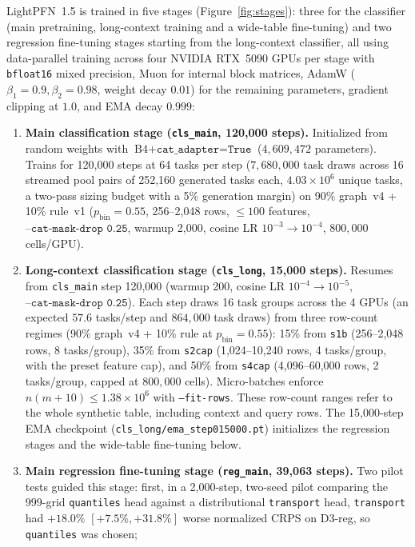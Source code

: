 \documentclass[11pt]{article}
\begin{document}
LightPFN~1.5 is trained in five stages (Figure~\ref{fig:stages}): three for the classifier (main pretraining, long-context training and a wide-table fine-tuning) and two regression fine-tuning stages starting from the long-context classifier, all using data-parallel training across four NVIDIA RTX~5090 GPUs per stage with \texttt{bfloat16} mixed precision, Muon \cite{jordan2024muon} for internal block matrices, AdamW ($\beta_1=0.9, \beta_2=0.98$, weight decay $0.01$) for the remaining parameters, gradient clipping at $1.0$, and EMA decay $0.999$: %
\begin{enumerate}
\item \textbf{Main classification stage (\texttt{cls\_main}, 120,000 steps).}
Initialized from random weights with $\text{B4} + \texttt{cat\_adapter=True}$ ($4{,}609{,}472$ parameters).
Trains for 120,000 steps at 64 tasks per step ($7{,}680{,}000$ task draws across 16 streamed pool pairs of 252,160 generated tasks each, $4.03\times 10^6$ unique tasks, a two-pass sizing budget with a 5\% generation margin) on 90\% graph~v4 + 10\% rule~v1 ($p_{\mathrm{bin}}=0.55$, 256--2,048 rows, $\le 100$ features, $\texttt{--cat-mask-drop 0.25}$, warmup 2,000, cosine LR $10^{-3}\to 10^{-4}$, $800{,}000$ cells/GPU). %
\item \textbf{Long-context classification stage (\texttt{cls\_long}, 15,000 steps).}
Resumes from \texttt{cls\_main} step 120,000 (warmup 200, cosine LR $10^{-4}\to 10^{-5}$, $\texttt{--cat-mask-drop 0.25}$).
Each step draws 16 task groups across the 4 GPUs (an expected $57.6$ tasks/step and $864{,}000$ task draws) from three row-count regimes (90\% graph~v4 + 10\% rule at $p_{\mathrm{bin}}=0.55$):
15\% from \texttt{s1b} (256--2,048 rows, 8 tasks/group),
35\% from \texttt{s2cap} (1,024--10,240 rows, 4 tasks/group, with the preset feature cap), and
50\% from \texttt{s4cap} (4,096--60,000 rows, 2 tasks/group, capped at $800{,}000$ cells). %
Micro-batches enforce $n(m+10)\le1.38\times10^6$ with \texttt{--fit-rows}. These row-count ranges refer to the whole synthetic table, including context and query rows.
The 15,000-step EMA checkpoint (\texttt{cls\_long/ema\_step015000.pt}) initializes the regression stages and the wide-table fine-tuning below.
\item \textbf{Main regression fine-tuning stage (\texttt{reg\_main}, 39,063 steps).}
Two pilot tests guided this stage: first, in a 2,000-step, two-seed pilot comparing the 999-grid \texttt{quantiles} head against a distributional \texttt{transport} head, \texttt{transport} had $+18.0\%$ $[+7.5\%, +31.8\%]$ worse normalized CRPS on D3-reg, so \texttt{quantiles} was chosen; %

\end{enumerate}
\end{document}
